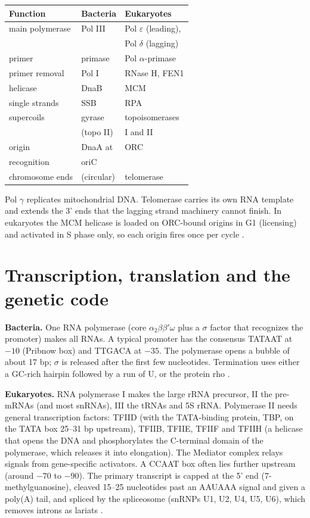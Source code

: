 \begin{center}
\begin{tabular}{lll}
Function & Bacteria & Eukaryotes \\
\hline
main polymerase & Pol III & Pol $\varepsilon$
(leading), \\
 & & Pol $\delta$ (lagging) \\
primer & primase & Pol $\alpha$-primase \\
primer removal & Pol I & RNase H, FEN1 \\
helicase & DnaB & MCM \\
single strands & SSB & RPA \\
supercoils & gyrase & topoisomerases \\
 & (topo II) & I and II \\
origin & DnaA at & ORC \\
recognition & oriC & \\
chromosome ends & (circular) & telomerase \\
\end{tabular}
\end{center}

Pol $\gamma$ replicates mitochondrial DNA.
Telomerase carries its own RNA template and
extends the 3' ends that the lagging strand
machinery cannot finish. In eukaryotes the
MCM helicase is loaded on ORC-bound origins
in G1 (licensing) and activated in S phase
only, so each origin fires once per cycle
\cite[Chapter 25]{voet2013fundamentals}.

\section{Transcription, translation and the
genetic code}
\label{section-mcb-expression}

\textbf{Bacteria.}
One RNA polymerase (core
$\alpha_2\beta\beta'\omega$ plus a $\sigma$
factor that recognizes the promoter) makes
all RNAs. A typical promoter has the
consensus TATAAT at $-10$ (Pribnow box) and
TTGACA at $-35$. The polymerase opens a
bubble of about 17 bp; $\sigma$ is released
after the first few nucleotides. Termination
uses either a GC-rich hairpin followed by a
run of U, or the protein rho \cite[Chapter
26]{voet2013fundamentals}.

\textbf{Eukaryotes.}
RNA polymerase I makes the large rRNA
precursor, II the pre-mRNAs (and most
snRNAs), III the tRNAs and 5S rRNA.
Polymerase II needs general transcription
factors: TFIID (with the TATA-binding
protein, TBP, on the TATA box 25--31 bp
upstream), TFIIB, TFIIE, TFIIF and TFIIH (a
helicase that opens the DNA and
phosphorylates the C-terminal domain of the
polymerase, which releases it into
elongation). The Mediator complex relays
signals from gene-specific activators. A
CCAAT box often lies further upstream (around
$-70$ to $-90$). The primary transcript is
capped at the 5' end (7-methylguanosine),
cleaved 15--25 nucleotides past an AAUAAA
signal and given a poly(A) tail, and spliced
by the spliceosome (snRNPs U1, U2, U4, U5,
U6), which removes introns as lariats
\cite[Chapter 26]{voet2013fundamentals}.

